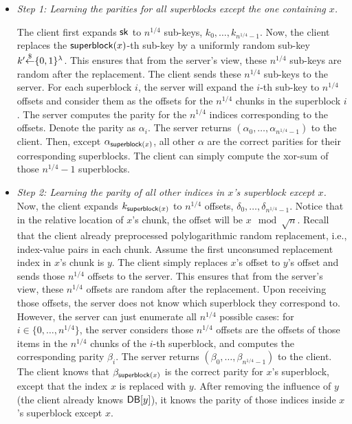 \begin{itemize}
    \item \textit{Step 1: Learning the parities for all superblocks except the
    one containing $x$.}
    
    The client first expands $\mathsf{sk}$ to $n^{1/4}$ sub-keys,
    $k_0,\dots,k_{n^{1/4}-1}$. Now, the client replaces the $\mathsf{superblock}(x)$-th
    sub-key by a uniformly random sub-key $k'{\overset{\$}{\leftarrow}}\{0,1\}^\lambda$. This ensures
    that from the server's view, these $n^{1/4}$ sub-keys are random after the
    replacement. The client sends these $n^{1/4}$ sub-keys to the server. For
    each superblock $i$, the server will expand the $i$-th sub-key to $n^{1/4}$
    offsets and consider them as the offsets for the $n^{1/4}$ chunks in the
    superblock $i$. The server computes the parity for the $n^{1/4}$ indices
    corresponding to the offsets. Denote the parity as $\alpha_i$. The server
    returns $(\alpha_0,\dots,\alpha_{n^{1/4}-1})$ to the client. Then, except
    $\alpha_{\mathsf{superblock}(x)}$, all other $\alpha$ are the correct parities for
    their corresponding superblocks. The client can simply compute the xor-sum
    of those $n^{1/4}-1$ superblocks.

    \item \textit{Step 2: Learning the parity of all other indices in $x$'s
    superblock except $x$.} Now, the client expands $k_{\mathsf{superblock}(x)}$ to
    $n^{1/4}$ offsets, $\delta_0,\dots,\delta_{n^{1/4}-1}$. Notice that in the
    relative location of $x$'s chunk, the offset will be $x \mod \sqrt{n}$.
    Recall that the client already preprocessed polylogarithmic random
    replacement, i.e., index-value pairs in each chunk. Assume the first
    unconsumed replacement index in $x$'s chunk is $y$. The client simply
    replaces $x$'s offset to $y$'s offset and sends those $n^{1/4}$ offsets to
    the server. This ensures that from the server's view, these $n^{1/4}$
    offsets are random after the replacement. Upon receiving those offsets, the
    server does not know which superblock they correspond to. However, the
    server can just enumerate all $n^{1/4}$ possible cases: for
    $i\in\{0,\dots,n^{1/4}\}$, the server considers those $n^{1/4}$ offsets are
    the offsets of those items in the $n^{1/4}$ chunks of the $i$-th superblock,
    and computes the corresponding parity $\beta_i$. The server returns
    $(\beta_0,\dots,\beta_{n^{1/4}-1})$ to the client. The client knows that
    $\beta_{\mathsf{superblock}(x)}$ is the correct parity for $x$'s superblock, except
    that the index $x$ is replaced with $y$. After removing the influence of $y$
    (the client already knows $\mathsf{DB}[y]$), it knows the parity of those indices
    inside $x$'s superblock except $x$.

\end{itemize}

